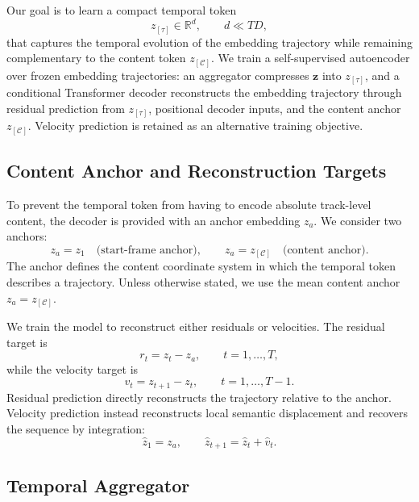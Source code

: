 \documentclass{article}
\newcommand{\zseq}{\mathbf{z}}          %
\newcommand{\zC}{z_{[\mathcal{C}]}}    %
\newcommand{\ztau}{z_{[\tau]}}          %
\newcommand{\R}{\mathbb{R}}
\newcommand{\za}{z_a}                   %
\begin{document}
Our goal is to learn a compact temporal token
%
\begin{equation}
  \ztau \in \R^d,
  \qquad d \ll TD,
\end{equation}
%
that captures the temporal evolution of the embedding trajectory
while remaining complementary to the content token $\zC$.  We train
a self-supervised autoencoder over frozen embedding trajectories:
an aggregator compresses $\zseq$ into $\ztau$, and a conditional
Transformer decoder reconstructs the embedding trajectory through
residual prediction from $\ztau$, positional decoder inputs, and the
content anchor $\zC$.  Velocity prediction is retained as an
alternative training objective.

\subsection{Content Anchor and Reconstruction Targets}
\label{ssec:targets}

To prevent the temporal token from having to encode absolute
track-level content, the decoder is provided with an anchor
embedding $\za$.  We consider two anchors:
%
\begin{equation}
  \za = z_1
  \quad \text{(start-frame anchor)},
  \qquad
  \za = \zC
  \quad \text{(content anchor)}.
  \label{eq:anchor}
\end{equation}
%
The anchor defines the content coordinate system in which the
temporal token describes a trajectory.  Unless otherwise stated, we
use the mean content anchor $\za=\zC$.

We train the model to reconstruct either residuals or velocities.
The residual target is
%
\begin{equation}
  r_t = z_t - \za,
  \qquad t=1,\ldots,T,
  \label{eq:residual}
\end{equation}
%
while the velocity target is
%
\begin{equation}
  v_t = z_{t+1} - z_t,
  \qquad t=1,\ldots,T-1.
  \label{eq:velocity}
\end{equation}
%
Residual prediction directly reconstructs the trajectory relative
to the anchor.  Velocity prediction instead reconstructs local
semantic displacement and recovers the sequence by integration:
%
\begin{equation}
  \hat{z}_1 = \za,
  \qquad
  \hat{z}_{t+1} = \hat{z}_{t} + \hat{v}_{t}.
  \label{eq:vel_integration}
\end{equation}
%

\subsection{Temporal Aggregator}
\label{ssec:aggregator}
\end{document}
